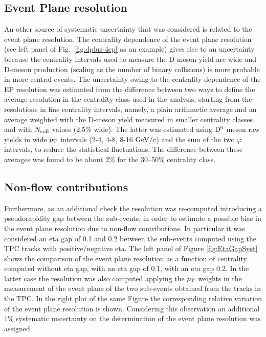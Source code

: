 \subsection{Event Plane resolution}
\label{sec:EPreso}
An other source of systematic uncertainty that was considered is 
related to the event plane resolution.
The centrality dependence of the event plane resolution 
(see left panel of Fig.~\ref{fig:dplus-4ep} as an example) gives rise to
an uncertainty because the centrality intervals used to measure the D-meson
yield are wide and D-meson production (scaling as the number of binary 
collisions) is more probable in more central events.
The uncertainty owing to the centrality dependence of the EP
resolution was estimated from the difference between two ways to
define the average resolution in the centrality class used in the
analysis, starting from the resolutions in fine centrality intervals,
namely, a plain arithmetic average and an average weighted with the
D-meson yield measured in smaller centrality classes and
with $N_{\rm coll}$ values (2.5\% wide). The
latter was estimated using ${\rm D^0}$ meson raw yields in wide $p_{\rm T}$
intervals (2-4, 4-8, 8-16 $\mathrm{GeV}/c$) and the sum of the two $\varphi$
intervals, to reduce the statistical fluctuations. The difference
between these averages was found to be about 2\% for the 30–50\%
centrality class.

\subsection{Non-flow contributions}
\label{sec:NonFlow}
Furthermore, as an additional check the resolution 
was re-computed introducing 
a pseudorapidity gap between the sub-events, 
in order to estimate a possible bias 
in the event plane resolution due to non-flow contributions. 
In particular it was considered an eta 
gap of 0.1 and 0.2 between the sub-events computed using
 the TPC tracks with positive/negative 
eta. The left panel of Figure \ref{fig:EtaGapSyst} shows
 the comparison of the event plane resolution
as a function of centrality computed without eta gap, 
with an eta gap of 0.1, with an eta gap 0.2. 
In the latter case the resolution was also computed 
applying the $p_{\rm T}$ weights in the measurement of
the event plane of the two sub-events obtained from the tracks in the TPC.
In the right plot of the same Figure the corresponding 
relative variation of the event plane resolution is shown.
Considering this observation an additional 1\%
 systematic uncertainty on the determination of the
event plane resolution was assigned.

